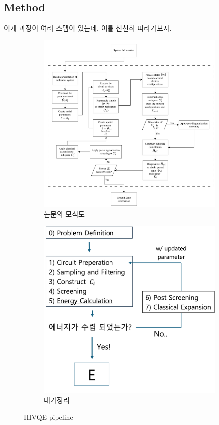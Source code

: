 \documentclass[10pt]{article}
\begin{document}
\subsection{Method}
이게 과정이 여러 스텝이 있는데, 이를 천천히 따라가보자. 
\begin{figure}[htbp]
  \centering
  \begin{subfigure}[b]{0.45\textwidth}
    \includegraphics[width=\textwidth]{fig/HIVQE_paper.png}
    \caption{논문의 모식도}
    \label{fig:first}
  \end{subfigure}
  \hfill
  \vrule width 1pt  %
  \hfill
  \begin{subfigure}[b]{0.45\textwidth}
    \includegraphics[width=\textwidth]{fig/HIVQE_my.png}
    \caption{내가정리}
    \label{fig:second}
  \end{subfigure}
  \caption{HIVQE pipeline}
  \label{fig:two_figures_side_by_side}
\end{figure}
\end{document}
